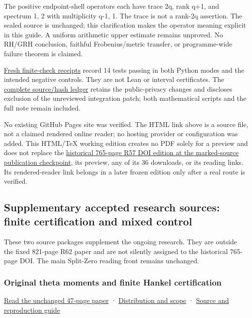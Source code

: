 \documentclass[
]{article}
\begin{document}
The positive endpoint-shell operators each have trace 2q, rank q+1, and
spectrum 1, 2 with multiplicity q-1, 1. The trace is not a rank-2q
assertion. The sealed source is unchanged; this clarification makes the
operator meaning explicit in this guide. A uniform arithmetic upper
estimate remains unproved. No RH/GRH conclusion, faithful
Frobenius/metric transfer, or programme-wide failure theorem is claimed.

\href{workbenches/tau-marked-product-four-endpoint/checks/PUBLIC_REPLAY.json}{Fresh
finite-check receipts} record 14 tests passing in both Python modes and
the intended negative controls. They are not Lean or interval
certificates. The
\href{workbenches/tau-marked-product-four-endpoint/PUBLIC_FILE_CHANGES.json}{complete
source/hash ledger} retains the public-privacy changes and discloses
exclusion of the unreviewed integration patch; both mathematical scripts
and the full note remain included.

No existing GitHub Pages site was verified. The HTML link above is a
source file, not a claimed rendered online reader; no hosting provider
or configuration was added. This HTML/TeX working edition creates no PDF
solely for a preview and does not replace the
\href{https://doi.org/10.5281/zenodo.22736292}{historical 765-page R57
DOI edition at the marked-source publication checkpoint}, its preview,
any of its 36 downloads, or its reading links. Its rendered-reader link
belongs in a later frozen edition only after a real route is verified.

\subsection{Supplementary accepted research sources: finite
certification and mixed
control}\label{supplementary-accepted-research-sources-finite-certification-and-mixed-control}

These two source packages supplement the ongoing research. They are
outside the fixed 821-page R62 paper and are not silently assigned to
the historical 765-page DOI. The main Split-Zero reading front remains
unchanged.

\subsubsection{Original theta moments and finite Hankel
certification}\label{original-theta-moments-and-finite-hankel-certification}

\href{workbenches/splitzero-tandem/continuations/20260913-accepted-followups/original-theta-certification/Tau_Theta_Hankel_Complete_Proofs.pdf}{Read
the unchanged 47-page paper} ·
\href{workbenches/splitzero-tandem/continuations/20260913-accepted-followups/original-theta-certification/PUBLIC_DISTRIBUTION.md}{Distribution
and scope} ·
\href{workbenches/splitzero-tandem/continuations/20260913-accepted-followups/original-theta-certification/README.md}{Source
and reproduction guide}
\end{document}
